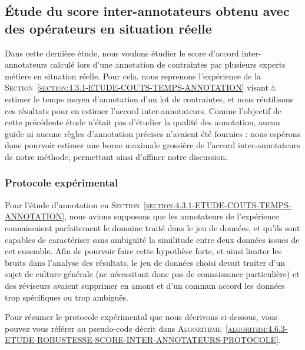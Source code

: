 		
	\subsection{Étude du score inter-annotateurs obtenu avec des opérateurs en situation réelle}
	\label{section:4.6.3-ETUDE-ROBUSTESSE-SCORE-INTER-ANNOTATEURS}
		
		Dans cette dernière étude, nous voulons étudier le score d'accord inter-annotateurs calculé lors d'une annotation de contraintes par plusieurs experts métiers en situation réelle.
		Pour cela, nous reprenons l'expérience de la \textsc{Section~\ref{section:4.3.1-ETUDE-COUTS-TEMPS-ANNOTATION}} visant à estimer le temps moyen d'annotation d'un lot de contraintes, et nous réutilisons ces résultats pour en estimer l'accord inter-annotateurs.
		Comme l'objectif de cette précédente étude n'était pas d'étudier la qualité des annotation, aucun guide ni aucune règles d'annotation précises n'avaient été fournies : nous espérons donc pourvoir estimer une borne maximale grossière de l'accord inter-annotateurs de notre méthode, permettant ainsi d'affiner notre discussion.
		
		\subsubsection{Protocole expérimental}
			
			\begin{leftBarWarning}
				Pour l'étude d'annotation en \textsc{Section~\ref{section:4.3.1-ETUDE-COUTS-TEMPS-ANNOTATION}}, nous avions supposons que les annotateurs de l'expérience connaissaient parfaitement le domaine traité dans le jeu de données, et qu'ils sont capables de caractériser sans ambiguïté la similitude entre deux données issues de cet ensemble.
				Afin de pourvoir faire cette hypothèse forte, et ainsi limiter les bruits dans l'analyse des résultats, le jeu de données choisi devait traiter d'un sujet de culture générale (ne nécessitant donc pas de connaissance particulière) et des réviseurs avaient supprimer en amont et d'un commun accord les données trop spécifiques ou trop ambiguës.
			\end{leftBarWarning}
			
			Pour résumer le protocole expérimental que nous décrivons ci-dessous, vous pouvez vous référer au pseudo-code décrit dans \textsc{Algorithme~\ref{algorithm:4.6.3-ETUDE-ROBUSTESSE-SCORE-INTER-ANNOTATEURS-PROTOCOLE}}.

